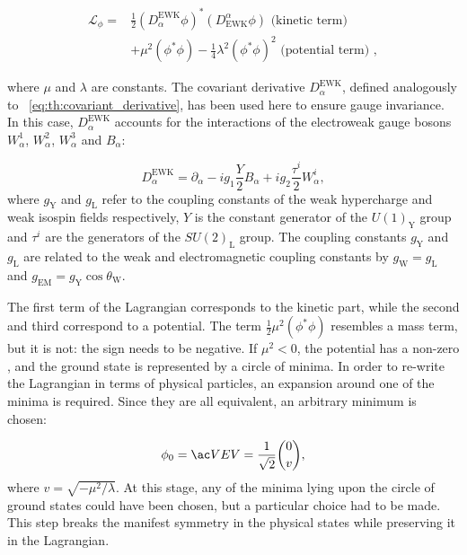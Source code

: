 \begin{equation}
\label{eq:th:higgs_lagrangian}
\begin{split}
\mathcal{L}_{\phi} = & \frac{1}{2}(D^{\textrm{EWK}}_{\alpha} \phi)^{*} (D^{\alpha}_{\textrm{EWK}} \phi) \text{ (kinetic term) }\\
 & + \mu^{2} (\phi^{*} \phi) - \frac{1}{4} \lambda^{2} (\phi^{*} \phi) ^{2}  \text{ (potential term) },
\end{split}
\end{equation}

where $\mu$ and $\lambda$ are constants. The covariant derivative $D^{{\textrm{EWK}}}_{\alpha}$, defined analogously to \Eq~\ref{eq:th:covariant_derivative}, has been used here to ensure gauge invariance. In this case, $D^{{\textrm{EWK}}}_{\alpha}$ accounts for the interactions of the electroweak gauge bosons $W^{1}_{\alpha}$, $W^{2}_{\alpha}$, $W^{3}_{\alpha}$ and $B_{\alpha}$:

\begin{equation}
\label{eq:th:full_covariant_derivative}
D^{{\textrm{EWK}}}_{\alpha} = \partial_{\alpha} -i g_{1} \frac{Y}{2} B_{\alpha} + i g_{2} \frac{\tau^{i}}{2} W^{i}_{\alpha},
\end{equation}
where $g_{\textrm{Y}}$ and $g_{\textrm{L}}$ refer to the coupling constants of the weak hypercharge and weak isospin fields respectively, $Y$ is the constant generator of the $U(1)_{\textrm{Y}}$ group and $\tau^{i}$ are the generators of the $SU(2)_{\textrm{L}}$ group. The coupling constants $g_{\textrm{Y}}$ and $g_{\textrm{L}}$ are related to the weak and electromagnetic coupling constants by $g_{\textrm{W}}=g_{\textrm{L}}$ and $g_{\textrm{EM}}= g_{\textrm{Y}} \cos \theta_{\textrm{W}}$. 

The first term of the Lagrangian corresponds to the kinetic part, while the second and third correspond to a potential. %
The term $ \frac{1}{2} \mu^{2} (\phi^{*} \phi)$ resembles a mass term, but it is not: the sign needs to be negative. If $\mu^{2}<0$, the potential has a non-zero \VEV, and the ground state is represented by a circle of minima. In order to re-write the Lagrangian in terms of physical particles, an expansion around one of the minima is required. Since they are all equivalent, an arbitrary minimum is chosen:

\begin{equation}
\label{eq:th:higgs_vev}
\phi_{0} = \VEV = \frac{1}{\sqrt{2}} \binom{0}{v} ,
\end{equation}
where $v=\sqrt{- \mu^{2} / \lambda}$. At this stage, any of the minima lying upon the circle of ground states could have been chosen, but a particular choice had to be made. This step breaks the manifest symmetry in the physical states while preserving it in the Lagrangian. 

